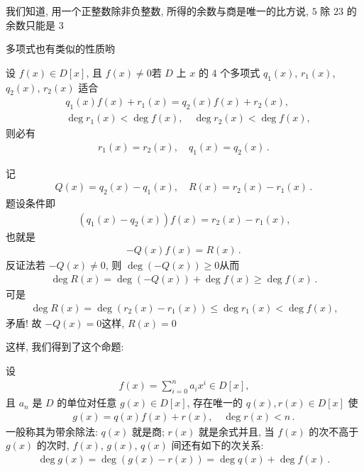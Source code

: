 我们知道, 用一个正整数除非负整数, 所得的余数与商是唯一的\period 比方说, $5$ 除 $23$ 的余数只能是 $3$\period

多项式也有类似的性质哟\period

\begin{proposition}
    设 $f(x) \in D[x]$, 且 $f(x) \neq 0$\period 若 $D$ 上 $x$ 的 $4$ 个多项式 $q_1 (x)$, $r_1 (x)$, $q_2 (x)$, $r_2 (x)$ 适合
    \begin{align*}
         & q_1 (x) f(x) + r_1 (x) = q_2 (x) f(x) + r_2 (x),          \\
         & \deg r_1 (x) < \deg f(x), \quad \deg r_2 (x) < \deg f(x),
    \end{align*}
    则必有
    \begin{align*}
        r_1 (x) = r_2 (x), \quad q_1 (x) = q_2 (x) \period
    \end{align*}
\end{proposition}

\begin{pf}
    记
    \begin{align*}
        Q(x) = q_2 (x) - q_1 (x), \quad R(x) = r_2 (x) - r_1 (x) \period
    \end{align*}
    题设条件即
    \begin{align*}
        (q_1 (x) - q_2 (x)) f(x) = r_2 (x) - r_1 (x),
    \end{align*}
    也就是
    \begin{align*}
        -Q(x) f(x) = R(x) \period
    \end{align*}
    反证法\period 若 $-Q(x) \neq 0$, 则 $\deg (-Q(x)) \geq 0$\period 从而
    \begin{align*}
        \deg R(x) = \deg (-Q(x)) + \deg f(x) \geq \deg f(x) \period
    \end{align*}
    可是
    \begin{align*}
        \deg R(x) = \deg (r_2(x) - r_1(x)) \leq \deg r_1 (x) < \deg f(x),
    \end{align*}
    矛盾! 故 $-Q(x) = 0$\period 这样, $R(x) = 0$\period
\end{pf}

这样, 我们得到了这个命题:

\begin{proposition}
    设
    \begin{align*}
        f(x) = \sum_{i = 0}^{n} a_i x^i \in D[x],
    \end{align*}
    且 $a_n$ 是 $D$ 的单位\period 对任意 $g(x) \in D[x]$, 存在唯一的 $q(x), r(x) \in D[x]$ 使
    \begin{align*}
        g(x) = q(x) f(x) + r(x), \quad \deg r(x) < n \period
    \end{align*}
    一般称其为带余除法: $q(x)$ 就是商; $r(x)$ 就是余式\period 并且, 当 $f(x)$ 的次不高于 $g(x)$ 的次时, $f(x)$, $g(x)$, $q(x)$ 间还有如下的次关系:
    \begin{align*}
        \deg g(x) = \deg (g(x) - r(x)) = \deg q(x) + \deg f(x) \period
    \end{align*}
\end{proposition}
